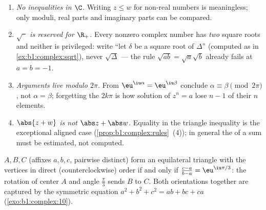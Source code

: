 \begin{remark}\label{rem:b1:complex:pitfalls}
\begin{enumerate}
  \item \emph{No inequalities in $\C$.} Writing $z \leq w$ for
        non-real numbers is meaningless; only moduli, real parts
        and imaginary parts can be compared.
  \item \emph{$\sqrt{\phantom z}$ is reserved for $\R_+$.} Every
        nonzero complex number has \emph{two} square roots and
        neither is privileged: write ``let $\delta$ be a square
        root of $\Delta$'' (computed as in
        \cref{ex:b1:complex:sqrt}), never $\sqrt\Delta$ ---
        the rule $\sqrt{ab} = \sqrt a\sqrt b$ already fails at
        $a = b = -1$.
  \item \emph{Arguments live modulo $2\pi$.} From
        $\eu^{\iu\alpha} = \eu^{\iu\beta}$ conclude $\alpha
        \equiv \beta \pmod{2\pi}$, not $\alpha = \beta$;
        forgetting the $2k\pi$ is how solution  of $z^n = a$
        lose $n - 1$ of their $n$ elements.
  \item \emph{$\abs{z + w}$ is not $\abs z + \abs w$.} Equality
        in the triangle inequality is the exceptional aligned
        case (\cref{prop:b1:complex:rules}~(4)); in general the
         of a sum must be estimated, not computed.
\end{enumerate}
\end{remark}

\begin{example}\label{ex:b1:complex:equilateral}
$A, B, C$ (affixes $a, b, c$, pairwise distinct) form an equilateral
triangle with the vertices in direct (counterclockwise) order if and
only if $\frac{c - a}{b - a} = \eu^{\iu\pi/3}$: the rotation of
center $A$ and angle $\frac\pi3$ sends $B$ to $C$. Both orientations
together are captured by the symmetric equation $a^2 + b^2 + c^2 = ab
+ bc + ca$ (\cref{exo:b1:complex:10}).
\end{example}

